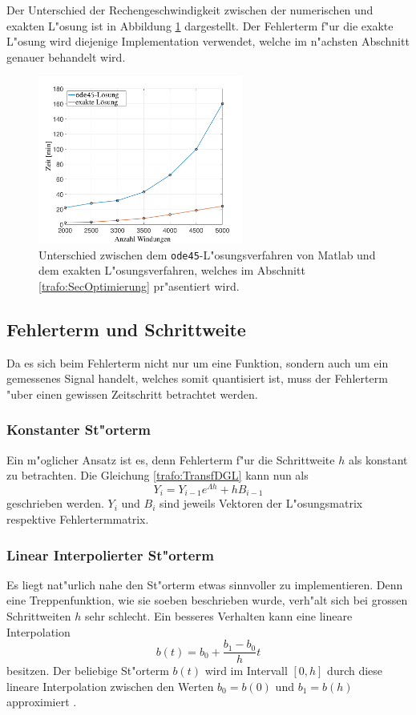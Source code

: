 \begin{refsection}
Der Unterschied der Rechengeschwindigkeit zwischen der numerischen und exakten L"osung ist in Abbildung \ref{trafo:ode45vsExact} dargestellt. Der Fehlerterm f"ur die exakte L"osung wird diejenige Implementation verwendet, welche im n"achsten Abschnitt genauer behandelt wird. 

	\begin{figure}
		\centering
		\includegraphics[width=0.6\textwidth]{./trafo/images/ode45vsExact.pdf}
		\caption{Unterschied zwischen dem \texttt{ode45}-L"osungsverfahren von Matlab und dem exakten L"osungsverfahren, welches im Abschnitt \ref{trafo:SecOptimierung} pr"asentiert wird.}
		\label{trafo:ode45vsExact}
	\end{figure}


\subsection{Fehlerterm und Schrittweite}
Da es sich beim Fehlerterm nicht nur um eine Funktion, sondern auch um ein gemessenes Signal handelt, welches somit quantisiert ist, muss der Fehlerterm "uber einen gewissen Zeitschritt betrachtet werden.

\subsubsection{Konstanter St"orterm}
Ein m"oglicher Ansatz ist es, denn Fehlerterm f"ur die Schrittweite $h$ als konstant zu betrachten. Die Gleichung \ref{trafo:TransfDGL} kann nun als
\begin{equation*}
	Y_i = Y_{i-1} e^{\Lambda h}  + h B_{i-1}
\end{equation*}
geschrieben werden. $Y_i$ und $B_i$ sind jeweils Vektoren der L"osungsmatrix respektive Fehlertermmatrix. 

\subsubsection{Linear Interpolierter St"orterm}
Es liegt nat"urlich nahe den St"orterm etwas sinnvoller zu implementieren. Denn eine Treppenfunktion, wie sie soeben beschrieben wurde, verh"alt sich bei grossen Schrittweiten $h$ sehr schlecht. Ein besseres Verhalten kann eine lineare Interpolation
\begin{equation*}
	b(t) = b_0 + \frac{b_1 - b_0}{h}t
\end{equation*}
besitzen. Der beliebige St"orterm $b(t)$ wird im Intervall $[0,h]$ durch diese lineare Interpolation zwischen den Werten $b_0 = b(0)$ und $b_1 = b(h)$ approximiert \cite{trafo:Mueller}.


\end{refsection}
